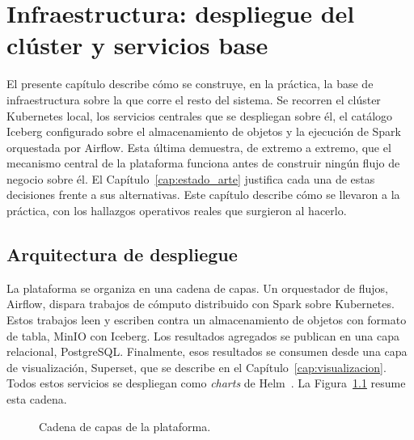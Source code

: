 \chapter{Infraestructura: despliegue del clúster y servicios base}
\label{cap:infraestructura}

El presente capítulo describe cómo se construye, en la práctica, la base
de infraestructura sobre la que corre el resto del sistema. Se recorren el
clúster Kubernetes local, los servicios centrales que se despliegan sobre
él, el catálogo Iceberg configurado sobre el almacenamiento de objetos y
la ejecución de Spark orquestada por Airflow. Esta última demuestra, de
extremo a extremo, que el mecanismo central de la plataforma funciona
antes de construir ningún flujo de negocio sobre él. El
Capítulo~\ref{cap:estado_arte} justifica cada una de estas decisiones
frente a sus alternativas. Este capítulo describe cómo se llevaron a la
práctica, con los hallazgos operativos reales que surgieron al hacerlo.

\section{Arquitectura de despliegue}
\label{sec:infraestructura_arquitectura}

La plataforma se organiza en una cadena de capas. Un orquestador de
flujos, Airflow, dispara trabajos de cómputo distribuido con Spark sobre
Kubernetes. Estos trabajos leen y escriben contra un almacenamiento de
objetos con formato de tabla, MinIO con Iceberg. Los resultados agregados
se publican en una capa relacional, PostgreSQL. Finalmente, esos
resultados se consumen desde una capa de visualización, Superset, que se
describe en el Capítulo~\ref{cap:visualizacion}. Todos estos servicios se
despliegan como \textit{charts} de Helm~\cite{helm_docs}. La
Figura~\ref{fig:tfm_arquitectura_cadena} resume esta cadena.

\begin{figure}[H]
  \centering
  \caption{Cadena de capas de la plataforma.}
  \label{fig:tfm_arquitectura_cadena}
\end{figure}

